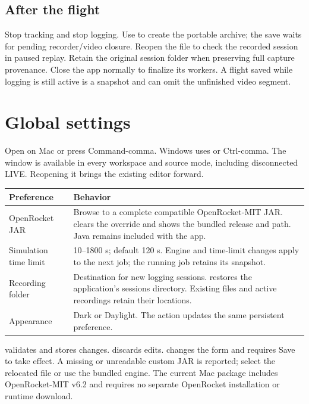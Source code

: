 \subsection{After the flight}
Stop tracking and stop logging. Use  to create the portable
archive; the save waits for pending recorder/video closure. Reopen the file to
check the recorded session in paused replay. Retain the original session folder
when preserving full capture provenance. Close the app normally to finalize its
workers. A flight saved while logging is still active is a snapshot and can omit
the unfinished video segment.

\section{Global settings}\label{sec:settings}
Open  on Mac or press Command-comma.
Windows uses  or Ctrl-comma. The window is available in every
workspace and source mode, including disconnected LIVE. Reopening it brings the
existing editor forward.

\begin{longtable}{@{}L{.24\linewidth}L{.69\linewidth}@{}}
\toprule Preference & Behavior \\\midrule\endhead
OpenRocket JAR & Browse to a complete compatible OpenRocket-MIT JAR.  clears the override and shows the bundled release and path. Java remains included with the app. \\
Simulation time limit & 10--1800 s; default 120 s. Engine and time-limit changes apply to the next job; the running job retains its snapshot. \\
Recording folder & Destination for new logging sessions.  restores the application's sessions directory. Existing files and active recordings retain their locations. \\
Appearance & Dark or Daylight. The  action updates the same persistent preference. \\
\bottomrule
\end{longtable}
 validates and stores changes.  discards edits.
 changes the form and requires Save to take effect.
A missing or unreadable custom JAR is reported; select the relocated file or use
the bundled engine. The current Mac package includes OpenRocket-MIT v6.2 and
requires no separate OpenRocket installation or runtime download.

